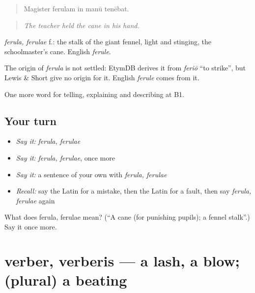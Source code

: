 \begin{quote}
Magister ferulam in manū tenēbat.
\end{quote}

\begin{quote}
\emph{The teacher held the cane in his hand.}
\end{quote}

\emph{ferula, ferulae} f.: the stalk of the giant fennel, light and stinging, the schoolmaster's cane. English \emph{ferule}.

\begin{cousinweb}
The origin of \emph{ferula} is not settled: EtymDB derives it from \emph{feriō} \textquotedblleft{}to strike\textquotedblright{}, but Lewis \& Short give no origin for it. English \emph{ferule} comes from it.
\end{cousinweb}

\begin{grammarlens}[title={What you've built}]
One more word for telling, explaining and describing at B1.
\end{grammarlens}

\subsection*{Your turn}
\begin{itemize}
\raggedright
  \item \emph{Say it:} \emph{ferula, ferulae}
  \item \emph{Say it:} \emph{ferula, ferulae}, once more
  \item \emph{Say it:} a sentence of your own with \emph{ferula, ferulae}
  \item \emph{Recall:} say the Latin for a mistake, then the Latin for a fault, then say \emph{ferula, ferulae} again
\end{itemize}

\begin{tcolorbox}[breakable,colback=teal!4,colframe=teal!35!black,title={Before you move on}]
What does ferula, ferulae mean? (\textquotedblleft{}A cane (for punishing pupils); a fennel stalk\textquotedblright{}.) Say it once more.
\end{tcolorbox}
\section[verber, verberis]{verber, verberis — a lash, a blow; (plural) a beating}

\label{lesson:LA-C408-verber}



